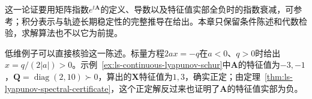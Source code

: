 这一论证要用矩阵指数$e^{t\bm A}$的定义、导数以及特征值实部全负时的指数衰减，可参考；积分表示与轨迹长期稳定性的完整推导在给出。本章只保留条件陈述和代数检验，求解算法也不以它为前提。

低维例子可以直接核验这一陈述。标量方程$2ax=-q$在$a<0$、$q>0$时给出$x=q/(2|a|)>0$。示例~\ref{ex:ls-continuous-lyapunov-schur}中$\bm A$的特征值为$-3,-1$，$\bm Q=\operatorname{diag}(2,10)\succ0$，算出的$\bm X$特征值为$1,3$，确实正定；由定理~\ref{thm:ls-lyapunov-spectral-certificate}，这个正定解反过来也证明了$\bm A$的特征值实部为负。
